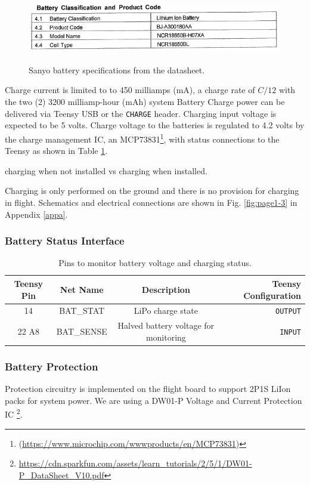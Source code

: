 \documentclass{article}
\begin{document}
\begin{figure}[h!]
	\centering
	\includegraphics[width=12cm]{images/battery-spec.png}
	\label{fig:bat-spec}
	\caption{Sanyo battery specifications from the datasheet.}
\end{figure}

Charge current is limited to to 450 milliamps (mA), a charge rate of $C/12$ with the two (2) 3200 milliamp-hour (mAh) system  Battery Charge power can be delivered via Teensy USB or the \texttt{CHARGE} header. Charging input voltage is expected to be 5 volts. Charge voltage to the batteries is regulated to 4.2 volts by the charge management IC, an MCP73831\footnote{ (\url{https://www.microchip.com/wwwproducts/en/MCP73831})}, with status connections to the Teensy as shown in Table \ref{tab:pins-battery}. 

charging when not installed vs charging when installed.

Charging is only performed on the ground and there is no provision for charging in flight. Schematics and electrical connections are shown in Fig. \ref{fig:page1-3} in Appendix \ref{appa}.

\subsubsection{Battery Status Interface}
\begin{table}[H]
    \centering
    \caption{Pins to monitor battery voltage and charging status.}
	\label{tab:pins-battery}
    \begin{tabular}{c|c|c|r}
    Teensy Pin & Net Name  & Description   & Teensy Configuration \\
    \hline 
    14 & BAT\_STAT & LiPo charge state & \texttt{OUTPUT} \\
    22 A8 & BAT\_SENSE    &  Halved battery voltage for monitoring &   \texttt{INPUT} 
    \end{tabular}
\end{table}

\subsubsection{Battery Protection}
Protection circuitry is implemented on the flight board to support 2P1S LiIon packs for system power. We are using a DW01-P Voltage and Current Protection IC \footnote{\url{https://cdn.sparkfun.com/assets/learn_tutorials/2/5/1/DW01-P_DataSheet_V10.pdf}}.
\end{document}
